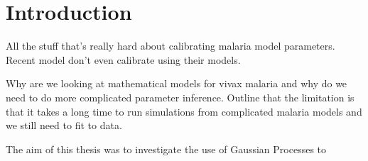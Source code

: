 \chapter{Introduction}

All the stuff that's really hard about calibrating malaria model parameters.
Recent model don't even calibrate using their models.

Why are we looking at mathematical models for vivax malaria and why do we need 
to do more complicated parameter inference. Outline that the limitation is that 
it takes a long time to run simulations from complicated malaria models and we 
still need to fit to data.

The aim of this thesis was to investigate the use of Gaussian Processes to
